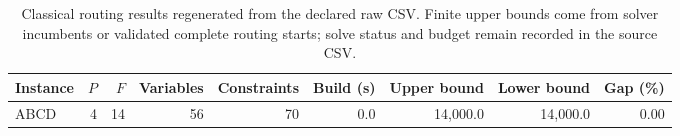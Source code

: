 \begin{table}[htbp]
\centering\small
\caption{Classical routing results regenerated from the declared raw CSV. Finite upper bounds come from solver incumbents or validated complete routing starts; solve status and budget remain recorded in the source CSV.}
\label{tab:khaled_30day_classical}
\begin{tabular}{lrrrrrrrr}
\toprule
Instance & $P$ & $F$ & Variables & Constraints & Build (s) & Upper bound & Lower bound & Gap (\%) \\
\midrule
ABCD & 4 & 14 & 56 & 70 & 0.0 & 14,000.0 & 14,000.0 & 0.00 \\
\bottomrule
\end{tabular}
\end{table}
